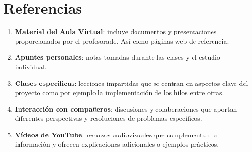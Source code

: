 \documentclass{article}
\begin{document}
\section{Referencias}
\begin{enumerate}
    \item \textbf{Material del Aula Virtual}: incluye documentos y presentaciones proporcionados por el profesorado. Así como páginas web de referencia.
    
    \item \textbf{Apuntes personales}: notas tomadas durante las clases y el estudio individual.
        
    \item \textbf{Clases específicas}: lecciones impartidas que se centran en aspectos clave del proyecto como por ejemplo la implementación de los hilos entre otras.
    
    \item \textbf{Interacción con compañeros}: discusiones y colaboraciones que aportan diferentes perspectivas y resoluciones de problemas específicos.
    
    \item \textbf{Vídeos de YouTube}: recursos audiovisuales que complementan la información y ofrecen explicaciones adicionales o ejemplos prácticos.
\end{enumerate}
    
\end{document}
